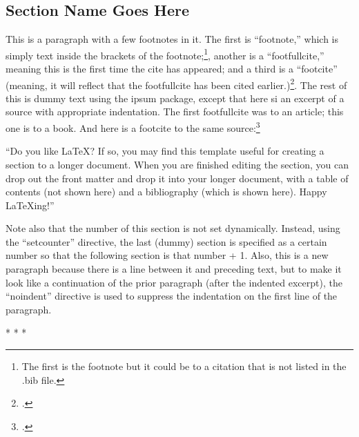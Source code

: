\documentclass{article}
\begin{document}
\begin{spacing}{1.35}

\setcounter{section}{6}  %
\section{Section Name Goes Here}
\pagestyle{plain}

 This is a paragraph with a few footnotes in it. The first is ``footnote,'' which is simply text inside the brackets of the footnote;\footnote{The first is the footnote but it could be to a citation that is not listed in the .bib file.}, another is a 
``footfullcite,'' meaning this is the first time the cite has appeared; and a third is a ``footcite'' (meaning, it will reflect that the footfullcite has been cited earlier.)\footcite[][p. 304]{Ellison-1985}. The rest of this is dummy text using the ipsum package, except that here si an excerpt of a source with appropriate indentation. The first footfullcite was to an article; this one is to a book. And here is a footcite to the same source:\footcite[][p. 392]{Banton-1983}

\begin{adjustwidth}{.65cm}{.5cm}
  \begin{singlespace}
  ``Do you like LaTeX? If so, you may find this template useful for creating a section to a longer document. When you are finished editing the section, you can drop out the front matter and drop it into your longer document, with a table of contents (not shown here) and a bibliography (which is shown here). Happy LaTeXing!''
  \end{singlespace}
  \end{adjustwidth}

\noindent
Note also that the number of this section is not set dynamically. Instead, using the ``setcounter'' directive, the last (dummy) section is specified as a certain number so that the following section is that number + 1. Also, this is a new paragraph because there is a line between it and preceding text, but to make it look like a continuation of the prior paragraph (after the indented excerpt), the ``noindent'' directive is used to suppress the indentation on the first line of the paragraph.
  
  \lipsum[1-2][]
  
  \begin{center}
  *\hspace{15pt} *\hspace{15pt} *
\end{center}


\end{spacing}
\end{document}
